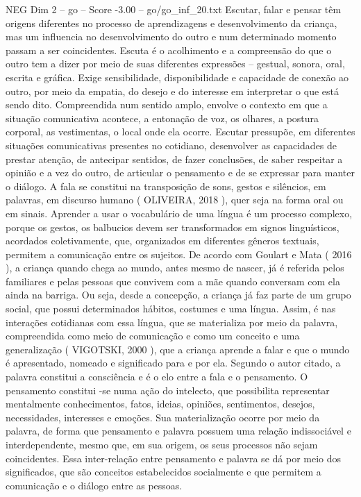 \begin{textsample}{NEG Dim 2 – go – Score -3.00 – go/go\_inf\_20.txt}
Escutar, falar e pensar têm origens diferentes no processo de aprendizagens e desenvolvimento da criança, mas um influencia no desenvolvimento do outro e num determinado momento passam a ser coincidentes.
Escuta é o acolhimento e a compreensão do que o outro tem a dizer por meio de suas diferentes expressões – gestual, sonora, oral, escrita e gráfica.
Exige sensibilidade, disponibilidade e capacidade de conexão ao outro, por meio da empatia, do desejo e do interesse em interpretar o que está sendo dito.
Compreendida num sentido amplo, envolve o contexto em que a situação comunicativa acontece, a entonação de voz, os olhares, a postura corporal, as vestimentas, o local onde ela ocorre.
Escutar pressupõe, em diferentes situações comunicativas presentes no cotidiano, desenvolver as capacidades de prestar atenção, de antecipar sentidos, de fazer conclusões, de saber respeitar a opinião e a vez do outro, de articular o pensamento e de se expressar para manter o diálogo.
A fala se constitui na transposição de sons, gestos e silêncios, em palavras, em discurso humano ( OLIVEIRA, 2018 ), quer seja na forma oral ou em sinais.
Aprender a usar o vocabulário de uma língua é um processo complexo, porque os gestos, os balbucios devem ser transformados em signos linguísticos, acordados coletivamente, que, organizados em diferentes gêneros textuais, permitem a comunicação entre os sujeitos.
De acordo com Goulart e Mata ( 2016 ), a criança quando chega ao mundo, antes mesmo de nascer, já é referida pelos familiares e pelas pessoas que convivem com a mãe quando conversam com ela ainda na barriga.
Ou seja, desde a concepção, a criança já faz parte de um grupo social, que possui determinados hábitos, costumes e uma língua.
Assim, é nas interações cotidianas com essa língua, que se materializa por meio da palavra, compreendida como meio de comunicação e como um conceito e uma generalização ( VIGOTSKI, 2000 ), que a criança aprende a falar e que o mundo é apresentado, nomeado e significado para e por ela.
Segundo o autor citado, a palavra constitui a consciência e é o elo entre a fala e o pensamento.
O pensamento constitui -se numa ação do intelecto, que possibilita representar mentalmente conhecimentos, fatos, ideias, opiniões, sentimentos, desejos, necessidades, interesses e emoções.
Sua materialização ocorre por meio da palavra, de forma que pensamento e palavra possuem uma relação indissociável e interdependente, mesmo que, em sua origem, os seus processos não sejam coincidentes.
Essa inter-relação entre pensamento e palavra se dá por meio dos significados, que são conceitos estabelecidos socialmente e que permitem a comunicação e o diálogo entre as pessoas.

\end{textsample}
